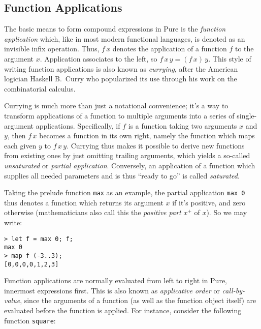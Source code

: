 \documentclass[a4paper,12pt]{article}
\begin{document}
\subsection{Function Applications}
\label{application}

The basic means to form compound expressions in Pure is the \emph{function application} which, like in most modern functional languages, is denoted as an invisible infix operation. Thus, $f\,x$ denotes the application of a function $f$ to the argument $x$. Application associates to the left, so $f\,x\,y = (f\,x)\,y$. This style of writing function applications is also known as \emph{currying}, after the American logician Haskell B.\ Curry who popularized its use through his work on the combinatorial calculus.

Currying is much more than just a notational convenience; it's a way to transform applications of a function to multiple arguments into a series of single-argument applications. Specifically, if $f$ is a function taking two arguments $x$ and $y$, then $f\,x$ becomes a function in its own right, namely the function which maps each given $y$ to $f\,x\,y$. Currying thus makes it possible to derive new functions from existing ones by just omitting trailing arguments, which yields a so-called \emph{unsaturated} or \emph{partial application}. Conversely, an application of a function which supplies all needed parameters and is thus ``ready to go'' is called \emph{saturated}.

Taking the prelude function \lstinline|max| as an example, the partial application \verb|max 0| thus denotes a function which returns its argument $x$ if it's positive, and zero otherwise (mathematicians also call this the \emph{positive part} $x^+$ of $x$). So we may write:

\begin{lstlisting}
> let f = max 0; f;
max 0
> map f (-3..3);
[0,0,0,0,1,2,3]
\end{lstlisting}

Function applications are normally evaluated from left to right in Pure, innermost expressions first. This is also known as \emph{applicative order} or \emph{call-by-value}, since the arguments of a function (as well as the function object itself) are evaluated before the function is applied. For instance, consider the following function \verb|square|:
\end{document}
